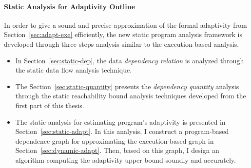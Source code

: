 \paragraph{{Static Analysis for Adaptivity Outline}}
%
In order to give a sound and precise approximation of the formal adaptivity from Section~\ref{sec:adapt-exe} efficiently, 
the new static program analysis framework is developed through three steps analysis
similar to the execution-based analysis.
\begin{itemize}
   \item In Section~\ref{sec:static-dep},
   the data \emph{dependency relation} is analyzed through the static data flow analysis technique.
   \item The Section~\ref{sec:static-quantity} presents the \emph{dependency quantity} analysis through
   the static reachability bound analysis techniques developed from the first part of this thesis.
   \item The static analysis for estimating program's adaptivity is presented in Section~\ref{sec:static-adapt}.
   In this analysis, I construct a program-based dependence graph for approximating the execution-based graph in Section~\ref{sec:dynamic-adapt}.
   Then, based on this graph, I design an algorithm
   computing the adaptivity upper bound soundly 
   and accurately.
   \end{itemize}